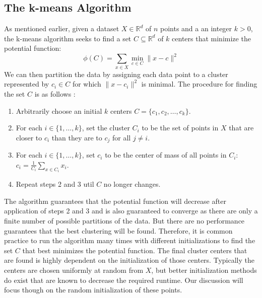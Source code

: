 \documentclass[10pt,twocolumn,letterpaper]{article}
\begin{document}
\subsection{The k-means Algorithm}
As mentioned earlier, given a dataset $X \in \mathbb{R}^d$ of $n$ points and a an integer $k > 0$, the k-means algorithm seeks to find a set $C \subseteq \mathbb{R}^d$ of $k$ centers that minimize the potential function: 
\begin{equation}
	\phi(C) = \sum_{x \in X} \min_{c \in C} \| x - c \|^2
\end{equation}
We can then partition the data by assigning each data point to a cluster represented by $c_i \in C$ for which $\| x - c_i \|^2$ is minimal. The procedure for finding the set $C$ is as follows \cite{arthur}:
\begin{enumerate}
	\item Arbitrarily choose an initial $k$ centers $C = \{c_1, c_2, \ldots , c_k \}$.
	\item For each $i \in \{1, \ldots , k \}$, set the cluster $C_i$ to be the set of points in $X$ that are closer to $c_i$ than they are to $c_j$ for all $j \neq i$.
	\item  For each $i \in \{1, \ldots , k \}$, set $c_i$ to be the center of mass of all points in $C_i$: $c_i = \frac{1}{C_i} \sum_{x \in C_i} x_i$.
	\item Repeat steps 2 and 3 util $C$ no longer changes. 
\end{enumerate}
The algorithm guarantees that the potential function will decrease after application of steps 2 and 3 and is also guaranteed to converge as there are only a finite number of possible partitions of the data. But there are no performance guarantees that the best clustering will be found. Therefore, it is common practice to run the algorithm many times with different initializations to find the set $C$ that best minimizes the potential function. The final cluster centers that are found is highly dependent on the initialization of those centers. Typically the centers are chosen uniformly at random from $X$, but better initialization methods do exist \cite{arthur} that are known to decrease the required runtime. Our discussion will focus though on the random initialization of these points. 
\end{document}
